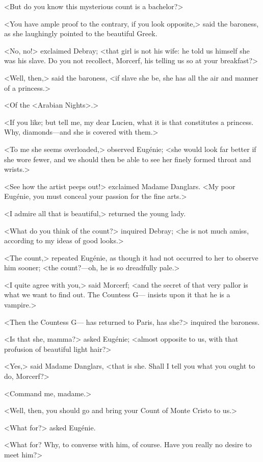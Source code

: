  <But do you know this mysterious count is a bachelor?> 

 <You have ample proof to the contrary, if you look opposite,> said the baroness, as she laughingly pointed to the beautiful Greek. 

 <No, no!> exclaimed Debray; <that girl is not his wife: he told us himself she was his slave. Do you not recollect, Morcerf, his telling us so at your breakfast?> 

 <Well, then,> said the baroness, <if slave she be, she has all the air and manner of a princess.> 

 <Of the <Arabian Nights>.> 

 <If you like; but tell me, my dear Lucien, what it is that constitutes a princess. Why, diamonds—and she is covered with them.> 

 <To me she seems overloaded,> observed Eugénie; <she would look far better if she wore fewer, and we should then be able to see her finely formed throat and wrists.> 

 <See how the artist peeps out!> exclaimed Madame Danglars. <My poor Eugénie, you must conceal your passion for the fine arts.> 

 <I admire all that is beautiful,> returned the young lady. 

 <What do you think of the count?> inquired Debray; <he is not much amiss, according to my ideas of good looks.> 

 <The count,> repeated Eugénie, as though it had not occurred to her to observe him sooner; <the count?—oh, he is so dreadfully pale.> 

 <I quite agree with you,> said Morcerf; <and the secret of that very pallor is what we want to find out. The Countess G— insists upon it that he is a vampire.> 

 <Then the Countess G— has returned to Paris, has she?> inquired the baroness. 

 <Is that she, mamma?> asked Eugénie; <almost opposite to us, with that profusion of beautiful light hair?> 

 <Yes,> said Madame Danglars, <that is she. Shall I tell you what you ought to do, Morcerf?> 

 <Command me, madame.> 

 <Well, then, you should go and bring your Count of Monte Cristo to us.> 

 <What for?> asked Eugénie. 

 <What for? Why, to converse with him, of course. Have you really no desire to meet him?> 

